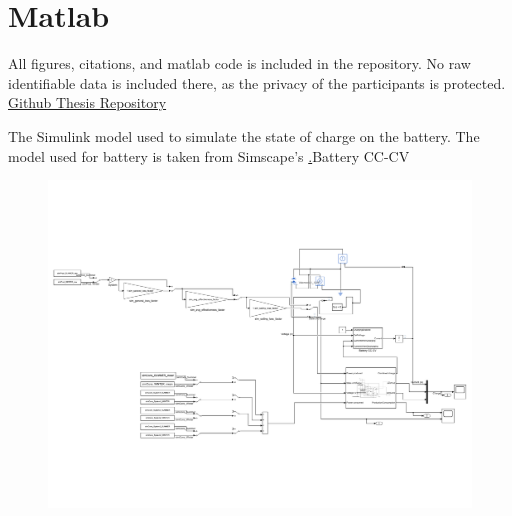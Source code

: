 \chapter{Matlab}
\label{apx:matlab}
All figures, citations, and matlab code is included in the repository. No raw identifiable data is included there, as the privacy of the participants is protected. 
\href{https://github.com/Jodlar98/Master-Thesis}{Github Thesis Repository}

The Simulink model used to simulate the state of charge on the battery. The model used for battery is taken from Simscape's \href{https://se.mathworks.com/help/simscape-battery/ref/batterycccv.html}.{Battery CC-CV}
\begin{figure}[H]
    \centering
    \includegraphics[width=\linewidth]{photos/Simulink.pdf}
\end{figure}